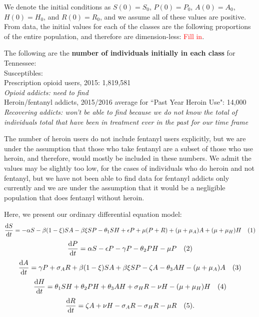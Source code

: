 \documentclass[12pt]{article}
\begin{document}
We denote the initial conditions as
$S(0)=S_{0}$, $P(0)=P_{0}$, $A(0)=A_{0}$, $H(0)=H_{0}$, and $R(0)=R_{0}$, and we assume all of these values are positive. From data, the initial values for each of the classes are the following proportions of the entire population, and therefore are dimension-less: \textcolor{red}{Fill in}. 

The following are the \textbf{number of individuals initially in each class} for Tennessee: \\
Susceptibles: \\
Prescription opioid users, 2015: 1,819,581 \cite{TNgov1} \\
\textit{Opioid addicts: need to find}  \\ %
Heroin/fentanyl addicts, 2015/2016 average for ``Past Year Heroin Use": 14,000 \cite{NSDUH2} \\
\textit{Recovering addicts: won't be able to find because we do not know the total of individuals total that have been in treatment ever in the past for our time frame}  

The number of heroin users do not include fentanyl users explicitly, but we are under the assumption that those who take fentanyl are a subset of those who use heroin, and therefore, would mostly be included in these numbers. We admit the values may be slightly too low, for the cases of individuals who do heroin and not fentanyl, but we have not been able to find data for fentanyl addicts only currently and we are under the assumption that it would be a negligible population that does fentanyl without heroin. 


 
Here, we present our ordinary differential equation model: %
\[\dv{S}{t} = -\alpha S - \beta (1- \xi) SA  -\beta \xi SP- \theta_{1} SH +\epsilon P +\mu (P+R) + (\mu+\mu_{A})A + (\mu+\mu_{H}) H \quad (1)\] 
\[\dv{P}{t} = \alpha S - \epsilon P  - \gamma P - \theta_{2}PH- \mu P    \quad(2)\]
\[\dv{A}{t} = \gamma P + \sigma_{A} R +\beta (1- \xi) SA  +\beta \xi SP -\zeta A - \theta_{3}AH-(\mu + \mu_{A})A   \quad (3)\]
\[\dv{H}{t} = \theta_{1}SH+\theta_{2}PH+\theta_{3}AH + \sigma_{H}R-\nu H-(\mu+\mu_{H})H  \quad (4)\]
\[\dv{R}{t} = \zeta A +\nu H -\sigma_{A}R-\sigma_{H}R -\mu R\quad(5).\]
\end{document}
